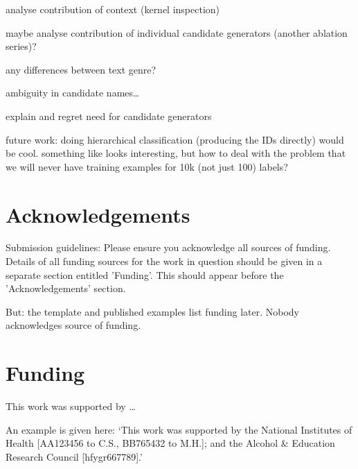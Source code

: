 \documentclass{bioinfo}
\begin{document}
analyse contribution of context (kernel inspection)

maybe analyse contribution of individual candidate generators (another ablation series)?

any differences between text genre?

ambiguity in candidate names\dots

explain and regret need for candidate generators

future work: doing hierarchical classification (producing the IDs directly) would be cool. something like \cite{guo-et-al:2018} looks interesting, but how to deal with the problem that we will never have training examples for 10k (not just 100) labels?



\section*{Acknowledgements}

Submission guidelines:
Please ensure you acknowledge all sources of funding.
Details of all funding sources for the work in question should be given in a separate section entitled 'Funding'. This should appear before the 'Acknowledgements' section.

But: the template and published examples list funding later.
Nobody acknowledges source of funding.
\vspace*{-12pt}



\section*{Funding}

This work was supported by \dots

An example is given here: ‘This work was supported by the National Institutes of Health [AA123456 to C.S., BB765432 to M.H.]; and the Alcohol \& Education Research Council [hfygr667789].’
\vspace*{-12pt}





\end{document}
